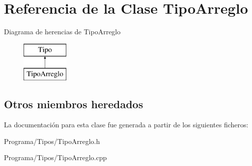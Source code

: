 \hypertarget{class_tipo_arreglo}{\section{Referencia de la Clase Tipo\-Arreglo}
\label{class_tipo_arreglo}
}
Diagrama de herencias de Tipo\-Arreglo\begin{figure}[H]
\begin{center}
\leavevmode
\includegraphics[height=2.000000cm]{class_tipo_arreglo}
\end{center}
\end{figure}
\subsection*{Otros miembros heredados}


La documentación para esta clase fue generada a partir de los siguientes ficheros\-:\begin{DoxyCompactItemize}
\item 
Programa/\-Tipos/Tipo\-Arreglo.\-h\item 
Programa/\-Tipos/Tipo\-Arreglo.\-cpp\end{DoxyCompactItemize}
